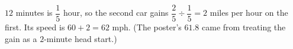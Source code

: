 $12$ minutes is $\dfrac{1}{5}$ hour, so the second car gains $\dfrac{2}{5}\div\dfrac{1}{5}=2$ miles per hour on the first. Its speed is $60+2=\boxed{62}$ mph. (The poster's $61.8$ came from treating the gain as a $2$-minute head start.)
